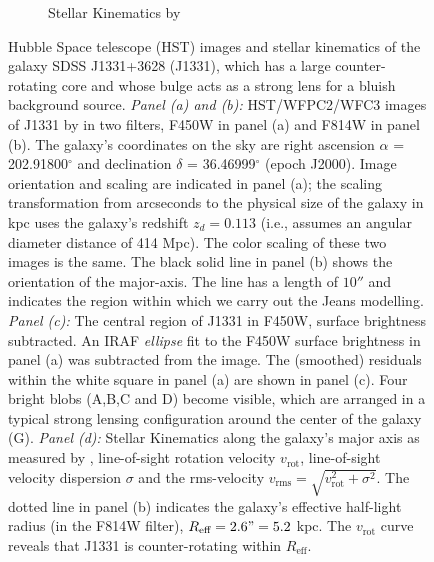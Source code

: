 \begin{figure}
\begin{subfigure}{.5\textwidth}
  \caption{Stellar Kinematics by \citet{SWELLSV}}
  \label{fig:kinematics}
\end{subfigure}
\caption{Hubble Space telescope (HST) images and stellar kinematics of the galaxy SDSS J1331+3628 (J1331), which has a large counter-rotating core and whose bulge acts as a strong lens for a bluish background source. \emph{Panel (a) and (b):} HST/WFPC2/WFC3 images of J1331 by \citet{SWELLSI} in two filters, F450W in panel (a) and F814W in panel (b). The galaxy's coordinates on the sky are right ascension $\alpha$ = 202.91800$^\circ$ and declination $\delta$ = 36.46999$^\circ$ (epoch J2000). Image orientation and scaling are indicated in panel (a); the scaling transformation from arcseconds to the physical size of the galaxy in kpc uses the galaxy's redshift $z_d = 0.113$ \citep{SWELLSIII} (i.e., assumes an angular diameter distance of 414 Mpc). The color scaling of these two images is the same. The black solid line in panel (b) shows the orientation of the major-axis. The line has a length of $10''$ and indicates the region within which we carry out the Jeans modelling. \emph{Panel (c):} The central region of J1331 in F450W, surface brightness subtracted. An IRAF \emph{ellipse} fit to the F450W surface brightness in panel (a) was subtracted from the image. The (smoothed) residuals within the white square in panel (a) are shown in panel (c). Four bright blobs (A,B,C and D) become visible, which are arranged in a typical strong lensing configuration around the center of the galaxy (G). \emph{Panel (d):} Stellar Kinematics along the galaxy's major axis as measured by \citet{SWELLSV}, line-of-sight rotation velocity $v_\text{rot}$, line-of-sight velocity dispersion $\sigma$ and the rms-velocity $v_\text{rms} = \sqrt{v_\text{rot}^2 + \sigma^2}$. The dotted line in panel (b) indicates the galaxy's effective half-light radius (in the F814W filter), $R_\text{eff} = 2.6" = 5.2$ kpc. The $v_\text{rot}$ curve reveals that J1331 is counter-rotating within $R_\text{eff}$.   }
\label{fig:specialJ1331}
\end{figure}